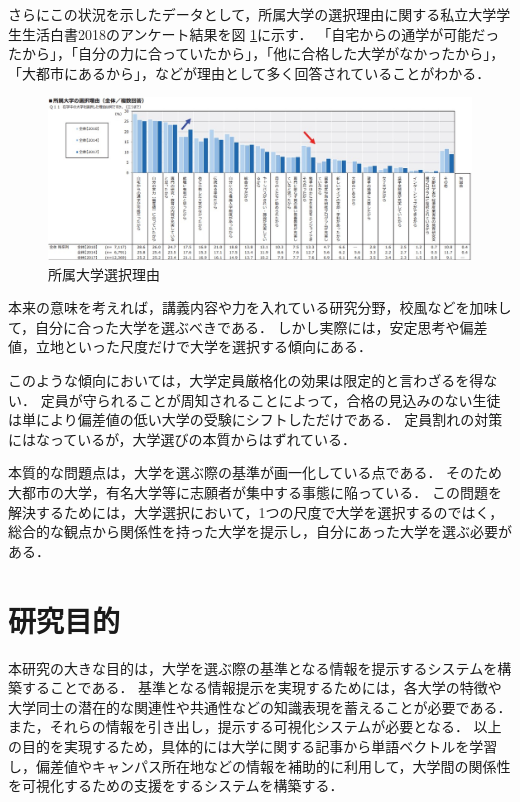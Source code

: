 さらにこの状況を示したデータとして，所属大学の選択理由に関する私立大学学生生活白書2018\cite{reason}のアンケート結果を図 \ref{fig:reason}に示す．
「自宅からの通学が可能だったから」，「自分の力に合っていたから」，「他に合格した大学がなかったから」，「大都市にあるから」，などが理由として多く回答されていることがわかる．
\begin{figure}[H]
\centering
\includegraphics[width=20cm, angle=90]{images/SS.jpg}
\caption[所属大学選択理由]{所属大学選択理由 \cite{reason}}
\label{fig:reason}
\end{figure}
本来の意味を考えれば，講義内容や力を入れている研究分野，校風などを加味して，自分に合った大学を選ぶべきである．
しかし実際には，安定思考や偏差値，立地といった尺度だけで大学を選択する傾向にある．

このような傾向においては，大学定員厳格化の効果は限定的と言わざるを得ない．
定員が守られることが周知されることによって，合格の見込みのない生徒は単により偏差値の低い大学の受験にシフトしただけである．
定員割れの対策にはなっているが，大学選びの本質からはずれている．

本質的な問題点は，大学を選ぶ際の基準が画一化している点である．
そのため大都市の大学，有名大学等に志願者が集中する事態に陥っている．
この問題を解決するためには，大学選択において，1つの尺度で大学を選択するのではく，総合的な観点から関係性を持った大学を提示し，自分にあった大学を選ぶ必要がある．


\section{研究目的}
本研究の大きな目的は，大学を選ぶ際の基準となる情報を提示するシステムを構築することである．
基準となる情報提示を実現するためには，各大学の特徴や大学同士の潜在的な関連性や共通性などの知識表現を蓄えることが必要である．
また，それらの情報を引き出し，提示する可視化システムが必要となる．
以上の目的を実現するため，具体的には大学に関する記事から単語ベクトルを学習し，偏差値やキャンパス所在地などの情報を補助的に利用して，大学間の関係性を可視化するための支援をするシステムを構築する．

